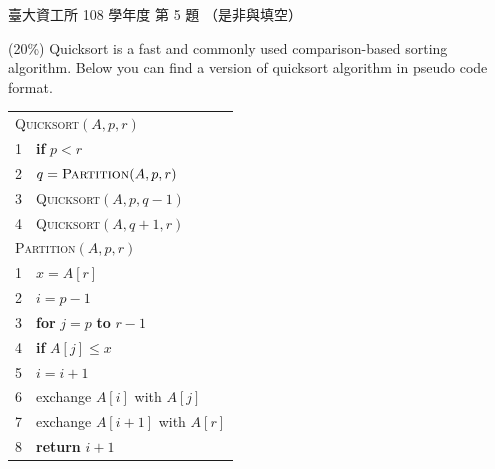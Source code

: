\begin{pastexam}[label={px:ntu-108-dsaa-05}]{臺大資工所 108 學年度 第 5 題}
（是非與填空）

(20\%) Quicksort is a fast and commonly used comparison-based sorting algorithm. Below you can
find a version of quicksort algorithm in pseudo code format.

\begin{center}
\begin{tabular}{rl}
\multicolumn{2}{l}{\textsc{Quicksort}$(A,p,r)$}\\
1 & \textbf{if} $p<r$\\
2 & \quad $q=\textsc{Partition}(A,p,r)$\\
3 & \quad \textsc{Quicksort}$(A,p,q-1)$\\
4 & \quad \textsc{Quicksort}$(A,q+1,r)$\\[6pt]
\multicolumn{2}{l}{\textsc{Partition}$(A,p,r)$}\\
1 & $x=A[r]$\\
2 & $i=p-1$\\
3 & \textbf{for} $j=p$ \textbf{to} $r-1$\\
4 & \quad \textbf{if} $A[j]\le x$\\
5 & \quad\quad $i=i+1$\\
6 & \quad\quad exchange $A[i]$ with $A[j]$\\
7 & exchange $A[i+1]$ with $A[r]$\\
8 & \textbf{return} $i+1$
\end{tabular}
\end{center}


\end{pastexam}
